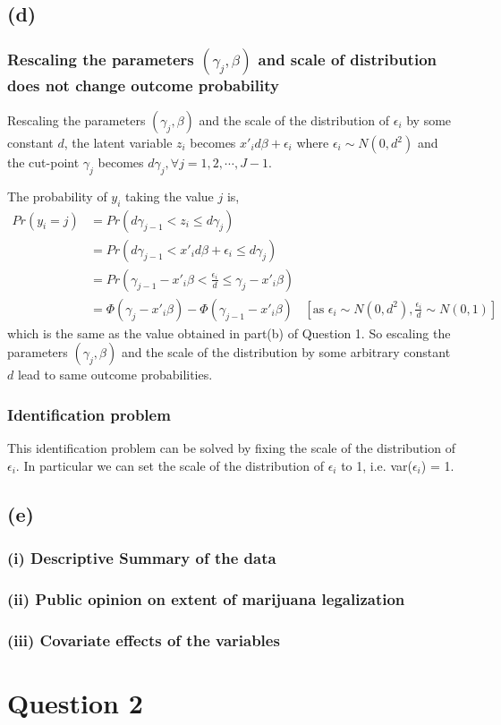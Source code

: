 \documentclass[a4paper]{article}
\begin{document}
\subsection*{(d)}

\subsubsection*{Rescaling the parameters $(\gamma_j,\beta)$ and scale of distribution does not change outcome probability}

Rescaling the parameters $(\gamma_j,\beta)$ and the scale of the distribution of $\epsilon_i$ by some constant $d$, the latent variable $z_i$ becomes $x'_id\beta + \epsilon_i$ where $\epsilon_i \sim N(0,d^2)$ and the cut-point $\gamma_j$ becomes $d\gamma_j, \forall j = 1, 2, \cdots, J-1$.

The probability of $y_i$ taking the value $j$ is,
\begin{align*}
    Pr(y_i=j) &= Pr(d\gamma_{j-1} < z_i \leq d\gamma_j) \\
              &= Pr(d\gamma_{j-1} < x'_i d\beta + \epsilon_i \leq d\gamma_j)\\
              &= Pr(\gamma_{j-1} - x'_i\beta < \frac{\epsilon_i}{d} \leq \gamma_j - x'_i\beta)\\
              &= \Phi(\gamma_j - x'_i\beta) - \Phi(\gamma_{j-1} - x'_i\beta) & [\text{as } \epsilon_i \sim N(0,d^2), \frac{\epsilon_i}{d} \sim N(0,1)]
\end{align*}
which is the same as the value obtained in part(b) of Question 1. So escaling the parameters $(\gamma_j,\beta)$ and the scale of the distribution by some arbitrary constant $d$ lead to same outcome probabilities.

\subsubsection*{Identification problem}
This identification problem can be solved by fixing the scale of the distribution of $\epsilon_i$. In particular we can set the scale of the distribution of $\epsilon_i$ to 1, i.e. var($\epsilon_i$) = 1.

\subsection*{(e)}

\subsubsection*{(i) Descriptive Summary of the data}


\subsubsection*{(ii) Public opinion on extent of marijuana legalization}


\subsubsection*{(iii) Covariate effects of the variables}


\newpage
\section*{Question 2}
\end{document}
